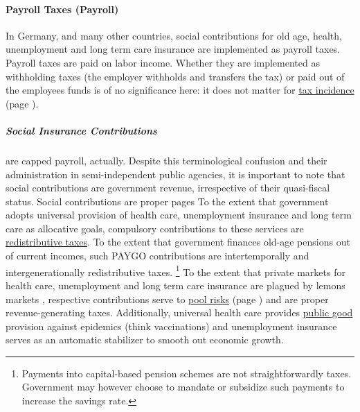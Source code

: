 \paragraph{Payroll Taxes (Payroll)}
	\label{sec:Payroll}
In Germany, and many other countries, social contributions for old age, health, unemployment and long term care insurance are implemented as payroll taxes.
Payroll taxes are paid on labor income.
Whether they are implemented as withholding taxes (the employer withholds and transfers the tax) or paid out of the employees funds is of no significance here:
it does not matter for \hyperref[sec:tax-incidence]{tax incidence} (page \pageref{sec:tax-incidence}).

\subparagraph{Social Insurance Contributions}
	\label{sec:SIC}
are capped  \gls{payroll}, actually.
Despite this terminological confusion and their administration in semi-independent public agencies, it is important to note that social contributions are government revenue, irrespective of their quasi-fiscal status.
Social contributions are proper pages
To the extent that government adopts universal provision of health care, unemployment insurance and long term care as allocative goals, compulsory contributions to these services are \hyperref[sec:fiscal-redistribution]{redistributive taxes}.
To the extent that government finances old-age pensions out of current incomes, such PAYGO contributions are intertemporally and intergenerationally redistributive taxes.
\footnote{
	Payments into capital-based pension schemes are not straightforwardly taxes.
	Government may however choose to mandate or subsidize such payments to increase the savings rate.
}
To the extent that private markets for health care, unemployment and long term care insurance are plagued by lemons markets \citep{Akerlof-1970-aa}, respective contributions serve to \hyperref[sec:state-insurance]{pool risks} (page \pageref{sec:state-insurance}) and are proper revenue-generating taxes.
Additionally, universal health care provides \hyperref[sec:public-good]{public good} provision against epidemics (think vaccinations) and unemployment insurance serves as an automatic stabilizer to smooth out economic growth.

